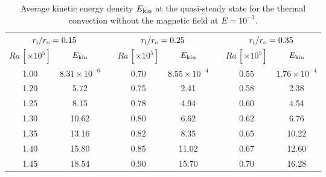 \begin{table}
\caption{Average kinetic energy density $E_{\rm kin}$ at the quasi-steady state for the thermal convection without the magnetic field at $E =  10^{-3}$.}
\begin{center}
\begin{tabular}{|ccc|ccc|cc|}
   \hline
  \multicolumn{2}{|c|}{$r_{\rm i}/r_{\rm o} = 0.15$} & \hspace{5mm} &
  \multicolumn{2}{|c|}{$r_{\rm i}/r_{\rm o} = 0.25$} & \hspace{5mm} &
  \multicolumn{2}{|c|}{$r_{\rm i}/r_{\rm o} = 0.35$} \\
  $Ra \, [\times 10^5] $ &  $E_{\rm kin}$ & &
  $Ra \, [\times 10^5] $ &  $E_{\rm kin}$ & &
  $Ra \, [\times 10^5] $ &  $E_{\rm kin}$ \\
    \hline
   1.00  &  $8.31 \times 10^{-6}$ & &  0.70 &  $8.55 \times 10^{-4}$ & &  0.55  &  $1.76 \times 10^{-4}$ \\
   1.20  &  5.72 & & 0.75 &  2.41 & &  0.58  &  2.38\\
   1.25 &  8.15 & &  0.78  &  4.94 & &  0.60  &  4.54\\
   1.30  &  10.62 & &  0.80  &  6.62 & &  0.62  &  6.76  \\
   1.35 &  13.16 & &  0.82  & 8.35 & &  0.65  &  10.22 \\
   1.40  &  15.80 & &  0.85  &  11.02 & &  0.67  &  12.60 \\
   1.45  &  18.54 & &  0.90  &  15.70 & &  0.70  &  16.28\\
 \hline
\end{tabular}
\end{center}
\label{table:Rac}
\end{table}